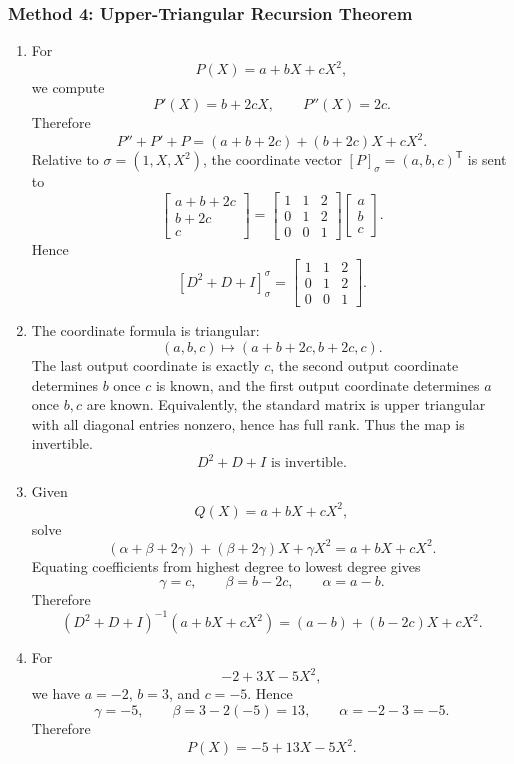 \documentclass[12pt]{article}
\newcommand{\T}{\mathsf{T}}
\begin{document}
\newpage
\subsubsection{Method 4: Upper-Triangular Recursion Theorem}
\begin{enumerate}[label=(\alph*)]
  \item For
  \[
    P(X)=a+bX+cX^2,
  \]
  we compute
  \[
    P'(X)=b+2cX,
    \qquad
    P''(X)=2c.
  \]
  Therefore
  \[
    P''+P'+P=(a+b+2c)+(b+2c)X+cX^2.
  \]
  Relative to $\sigma=(1,X,X^2)$, the coordinate vector $[P]_{\sigma}=(a,b,c)^\T$ is sent to
  \[
    \begin{bmatrix}
      a+b+2c\\
      b+2c\\
      c
    \end{bmatrix}
    =
    \begin{bmatrix}
      1&1&2\\
      0&1&2\\
      0&0&1
    \end{bmatrix}
    \begin{bmatrix}
      a\\b\\c
    \end{bmatrix}.
  \]
  Hence
  \[
    \boxed{[D^2+D+I]_{\sigma}^{\sigma}
    =
    \begin{bmatrix}
      1&1&2\\
      0&1&2\\
      0&0&1
    \end{bmatrix}.}
  \]

  \item The coordinate formula is triangular:
  \[
    (a,b,c)\mapsto (a+b+2c,b+2c,c).
  \]
  The last output coordinate is exactly $c$, the second output coordinate determines $b$ once $c$ is known, and the first output coordinate determines $a$ once $b,c$ are known. Equivalently, the standard matrix is upper triangular with all diagonal entries nonzero, hence has full rank. Thus the map is invertible.
  \[
    \boxed{D^2+D+I\text{ is invertible}.}
  \]

  \item Given
  \[
    Q(X)=a+bX+cX^2,
  \]
  solve
  \[
    (\alpha+\beta+2\gamma)+(\beta+2\gamma)X+\gamma X^2=a+bX+cX^2.
  \]
  Equating coefficients from highest degree to lowest degree gives
  \[
    \gamma=c,
    \qquad
    \beta=b-2c,
    \qquad
    \alpha=a-b.
  \]
  Therefore
  \[
    \boxed{(D^2+D+I)^{-1}(a+bX+cX^2)=(a-b)+(b-2c)X+cX^2.}
  \]

  \item For
  \[
    -2+3X-5X^2,
  \]
  we have $a=-2$, $b=3$, and $c=-5$. Hence
  \[
    \gamma=-5,
    \qquad
    \beta=3-2(-5)=13,
    \qquad
    \alpha=-2-3=-5.
  \]
  Therefore
  \[
    \boxed{P(X)=-5+13X-5X^2.}
  \]
\end{enumerate}
\newpage
\end{document}
